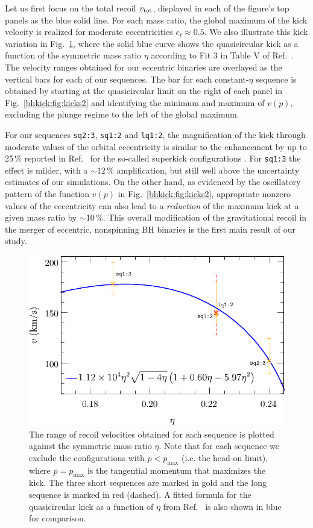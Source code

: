 Let us first focus on the total recoil $v_{\rm tot}$, displayed in each
of the figure's top panels as the blue solid line.  For each mass
ratio, the global maximum of the kick velocity is realized for
moderate eccentricities
$e_t\approx 0.5$.
We also illustrate this kick variation in
Fig.~\ref{bhkick:fig:quasicircular-fit-comparison}, where
the solid blue curve shows the
quasicircular kick as a function
of the symmetric mass ratio $\eta$ according to
Fit 3 in Table V of Ref.~\cite{Healy:2017mvh}. The velocity ranges
obtained for our eccentric binaries are
overlayed as the vertical bars for each of our sequences.
The bar for each constant-$\eta$ sequence
is obtained by starting at the quasicircular limit on the 
right of each panel in Fig.~\ref{bhkick:fig:kicks2} and identifying
the minimum and maximum of $v(p)$, excluding the 
plunge regime to the left of the global maximum.

For our sequences \texttt{sq2:3}, \texttt{sq1:2} and
\texttt{lq1:2}, the 
magnification of the kick through moderate values
of the orbital eccentricity is similar to the
enhancement by up to 25\,\% reported in
Ref.~\cite{Sperhake:2019wwo}
for the so-called superkick configurations
\cite{Gonzalez:2007hi,Campanelli:2007cga}.
For \texttt{sq1:3} the effect is milder, with a
$\sim 12\,\%$ amplification, but still well above
the uncertainty estimates of our simulations.
On the other hand, as evidenced by the oscillatory pattern
of the function $v(p)$ in Fig.~\ref{bhkick:fig:kicks2}, appropriate
nonzero values of the eccentricity can also
lead to a {\it reduction} of the maximum kick at a given mass ratio
by $\sim 10\,\%$.
This overall modification of the gravitational recoil
in the merger of eccentric, nonspinning BH binaries
is the first main result of our study.

\begin{figure}[t]
    \centering
    \includegraphics[width=0.7\columnwidth]{bhkick/quasicircular-fit2.pdf}
    \caption{The range of recoil velocities obtained for each sequence
    is plotted against the symmetric mass ratio $\eta$. Note that for
    each sequence we exclude the configurations with 
    $p<p_{\text{max}}$ (i.e. the head-on limit), where 
    $p=p_{\text{max}}$ is the tangential momentum that maximizes the kick.
    The three short sequences are marked in gold and the long sequence is 
    marked in red (dashed). A fitted formula for the quasicircular
    kick as a function of $\eta$ from Ref.~\cite{Healy:2017mvh} is
    also shown in blue for comparison. 
    }
    \label{bhkick:fig:quasicircular-fit-comparison}
\end{figure}

